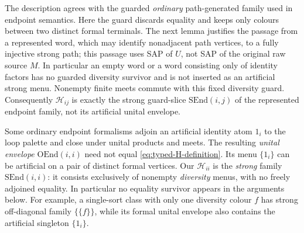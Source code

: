 The description agrees with the guarded \emph{ordinary} path-generated
family used in endpoint semantics.  Here the guard discards equality
and keeps only colours between two distinct formal terminals.  The
next lemma justifies the passage from a represented word, which may
identify nonadjacent path vertices, to a fully injective strong path;
this passage uses SAP of $U$, not SAP of the original raw source $M$.
In particular an empty word or a word consisting only of identity
factors has no guarded diversity survivor and is not inserted as an
artificial strong menu.  Nonempty finite meets commute with this fixed
diversity guard.  Consequently $\mathcal H_{ij}$ is exactly the strong
guard-slice $\mathrm{SEnd}(i,j)$ of the represented endpoint family,
not its artificial unital envelope.

\begin{remark}
\label{rem:typed-identity-firewall}
Some ordinary endpoint formalisms adjoin an artificial identity atom
$1_i$ to the loop palette and close under unital products and meets.
The resulting \emph{unital envelope} $\mathrm{OEnd}(i,i)$ need not equal
\eqref{eq:typed-H-definition}.  Its menu $\{1_i\}$ can be artificial
on a pair of distinct formal vertices.  Our $\mathcal H_{ii}$ is the
\emph{strong} family $\mathrm{SEnd}(i,i)$: it consists exclusively of
nonempty \emph{diversity} menus, with no freely adjoined equality.
In particular no equality survivor appears in the arguments below.
For example, a single-sort class with only one diversity colour
$f$ has strong off-diagonal family $\{\{f\}\}$, while its formal
unital envelope also contains the artificial singleton $\{1_i\}$.
\end{remark}

